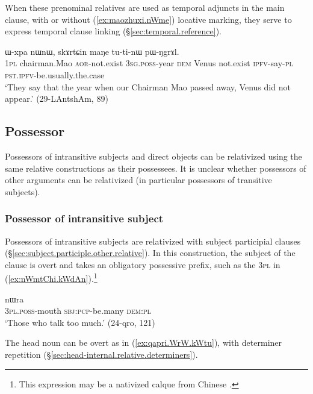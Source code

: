 When these prenominal relatives are used as temporal adjuncts in the main clause, with or without (\ref{ex:maozhuxi.nWme}) locative marking, they serve to express temporal clause linking (§\ref{sec:temporal.reference}).

\begin{exe}
\ex \label{ex:maozhuxi.nWme}
 ɯ-xpa nɯnɯ, skɤrtɕin maŋe tu-ti-nɯ pɯ-ŋgrɤl. \\
\textsc{1pl} chairman.Mao \textsc{aor}-not.exist \textsc{3sg}.\textsc{poss}-year \textsc{dem} Venus not.exist \textsc{ipfv}-say-\textsc{pl} \textsc{pst}.\textsc{ipfv}-be.usually.the.case \\
\glt `They say that the year when our Chairman Mao passed away, Venus did not appear.' (29-LAntshAm, 89)
\end{exe}
 

\subsection{Possessor} \label{sec:possessor.relativization}
Possessors of intransitive subjects and direct objects can be relativized using the same relative constructions as their possessees. It is unclear whether possessors of other arguments can be relativized (in particular possessors of transitive subjects).

\subsubsection{Possessor of intransitive subject}  \label{sec:S.possessor.relativization}
Possessors of intransitive subjects are relativized with subject participial clauses (§\ref{sec:subject.participle.other.relative}). In this construction, the subject of the clause is overt and takes an obligatory possessive prefix, such as the \textsc{3pl}  in (\ref{ex:nWmtChi.kWdAn}).\footnote{This expression may be a nativized calque from Chinese . }

\begin{exe}
\ex \label{ex:nWmtChi.kWdAn}
 nɯra \\
\textsc{3pl}.\textsc{poss}-mouth \textsc{sbj}:\textsc{pcp}-be.many \textsc{dem}:\textsc{pl} \\
\glt `Those who talk too much.' (24-qro, 121)
\end{exe}

The head noun can be overt  as in (\ref{ex:qapri.WrW.kWtu}), with determiner repetition (§\ref{sec:head-internal.relative.determiners}).


